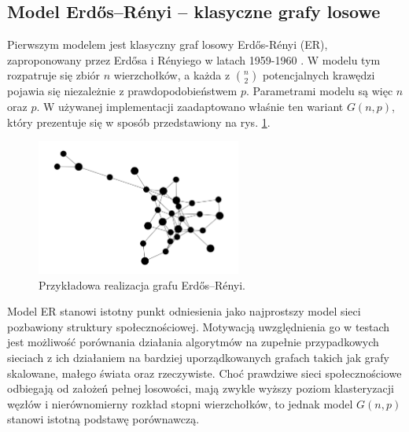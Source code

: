 \subsection{Model Erdős--Rényi -- klasyczne grafy losowe}
Pierwszym modelem jest klasyczny graf losowy Erdős-Rényi (ER), zaproponowany przez Erdősa i Rényiego w latach 1959-1960 \cite{ErdosRenyi1960}. W modelu tym rozpatruje się zbiór $n$ wierzchołków, a każda z $\binom{n}{2}$ potencjalnych krawędzi pojawia się niezależnie z prawdopodobieństwem $p$. Parametrami modelu są więc $n$ oraz $p$. W używanej implementacji zaadaptowano właśnie ten wariant $G(n,p)$, który prezentuje się w sposób przedstawiony na rys. \ref{fig:ER}.

\begin{figure}[h]
    \centering
    \includegraphics[width=0.6\textwidth]{assets/test_data/random.png}
    \caption{Przykładowa realizacja grafu Erdős--Rényi.}
    \label{fig:ER}
\end{figure}

Model ER stanowi istotny punkt odniesienia jako najprostszy model sieci pozbawiony struktury społecznościowej. Motywacją uwzględnienia go w testach jest możliwość porównania działania algorytmów na zupełnie przypadkowych sieciach z ich działaniem na bardziej uporządkowanych grafach takich jak grafy skalowane, małego świata oraz rzeczywiste. Choć prawdziwe sieci społecznościowe odbiegają od założeń pełnej losowości, mają zwykle wyższy poziom klasteryzacji węzłów i nierównomierny rozkład stopni wierzchołków, to jednak model $G(n, p)$ stanowi istotną podstawę porównawczą.

